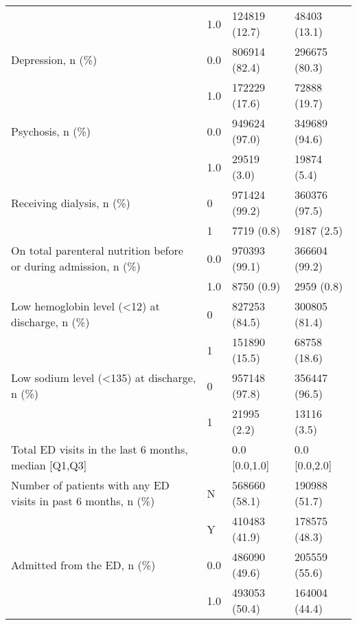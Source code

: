 \begin{tabular}{llll}
                                       & 1.0 &                         124819 (12.7) &      48403 (13.1) \\
Depression, n (\%) & 0.0 &                         806914 (82.4) &     296675 (80.3) \\
                                       & 1.0 &                         172229 (17.6) &      72888 (19.7) \\
Psychosis, n (\%) & 0.0 &                         949624 (97.0) &     349689 (94.6) \\
                                       & 1.0 &                           29519 (3.0) &       19874 (5.4) \\
Receiving dialysis, n (\%) & 0 &                         971424 (99.2) &     360376 (97.5) \\
                                       & 1 &                            7719 (0.8) &        9187 (2.5) \\
On total parenteral nutrition before or during admission, n (\%) & 0.0 &                         970393 (99.1) &     366604 (99.2) \\
                                       & 1.0 &                            8750 (0.9) &        2959 (0.8) \\
Low hemoglobin level (<12) at discharge, n (\%) & 0 &                         827253 (84.5) &     300805 (81.4) \\
                                       & 1 &                         151890 (15.5) &      68758 (18.6) \\
Low sodium level (<135) at discharge, n (\%) & 0 &                         957148 (97.8) &     356447 (96.5) \\
                                       & 1 &                           21995 (2.2) &       13116 (3.5) \\
Total ED visits in the last 6 months, median [Q1,Q3] &   &                         0.0 [0.0,1.0] &     0.0 [0.0,2.0] \\
Number of patients with any ED visits in past 6 months, n (\%) & N &                         568660 (58.1) &     190988 (51.7) \\
                                       & Y &                         410483 (41.9) &     178575 (48.3) \\
Admitted from the ED, n (\%) & 0.0 &                         486090 (49.6) &     205559 (55.6) \\
                                       & 1.0 &                         493053 (50.4) &     164004 (44.4) \\

\end{tabular}
